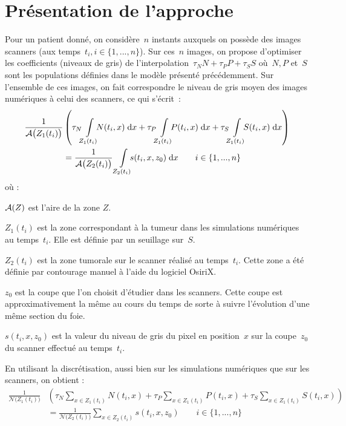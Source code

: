 \documentclass[main.tex]{subfiles}
\begin{document}
\section{Présentation de l'approche}
Pour un patient donné, on considère~$n$ instants auxquels on possède des images scanners (aux temps~$t_i, i\in \{ 1,...,n \}$). Sur ces~$n$ images, on propose d'optimiser les coefficients (niveaux de gris) de l'interpolation~$\tau_N N + \tau_P P + \tau_S S$ où~$N, P$ et~$S$ sont les populations définies dans le modèle présenté précédemment. Sur l'ensemble de ces images, on fait correspondre le niveau de gris moyen des images numériques à celui des scanners, ce qui s'écrit~:
\begin{equation}
\label{eq:optim_grey_integ_aire}
\begin{aligned}
\frac{1}{\aire\big(Z_1(t_i)\big)}&\left( \tau_N\intperso{Z_1(t_i)}N(t_i,x) \dx + \tau_P\intperso{Z_1(t_i)}P(t_i,x) \dx + \tau_S\intperso{Z_1(t_i)} S(t_i,x) \dx \right) \\
&= \frac{1}{\aire\big(Z_2(t_i)\big)} \ \intperso{Z_2(t_i)} s(t_i,x,z_0) \dx \qquad i \in \{1,...,n\}
\end{aligned}
\end{equation}
où : \begin{myitemize}
\item $\mathcal{A}(Z)$ est l'aire de la zone $Z$.
\item $Z_1(t_i)$ est la zone correspondant à la tumeur dans les simulations numériques au temps~$t_i$. Elle est définie par un seuillage sur~$S$.
\item $Z_2(t_i)$ est la zone tumorale sur le scanner réalisé au temps~$t_i$. Cette zone a été définie par contourage manuel à l'aide du logiciel OsiriX.
\item $z_0$ est la coupe que l'on choisit d'étudier dans les scanners. Cette coupe est approximativement la même au cours du temps de sorte à suivre l'évolution d'une même section du foie. 
\item $s(t_i,x,z_0)$ est la valeur du niveau de gris du pixel en position~$x$ sur la coupe~$z_0$ du scanner effectué au temps~$t_i$.
\end{myitemize}
En utilisant la discrétisation, aussi bien sur les simulations numériques que sur les scanners, on obtient :
\begin{equation}
\label{eq:optim_grey_eq_discr}
\begin{aligned}
\frac{1}{\mathcal{N}\big(Z_1(t_i)\big)}&\left( \tau_N\!\!\sum_{x\in Z_1(t_i)}\!\!N(t_i,x) + \tau_P\!\!\sum_{x\in Z_1(t_i)}\!\!P(t_i,x) + \tau_S\!\!\sum_{x\in Z_1(t_i)}\!\!S(t_i,x) \right) \\
&= \frac{1}{\mathcal{N}\big(Z_2(t_i)\big)} \sum_{x\in Z_2(t_i)}\!\! s(t_i,x,z_0) \qquad i \in \{1,...,n\}
\end{aligned}
\end{equation}
\end{document}
